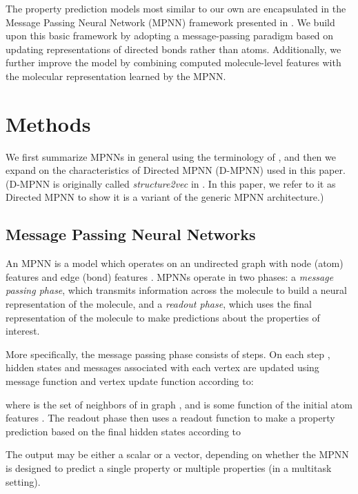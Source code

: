 \documentclass[journal=jcisd8,manuscript=article]{achemso}
\begin{document}
The property prediction models most similar to our own are encapsulated in the Message Passing Neural Network (MPNN) framework presented in \citeauthor{gilmer2017neural}\cite{gilmer2017neural}. We build upon this basic framework by adopting a message-passing paradigm based on updating representations of directed bonds rather than atoms. Additionally, we further improve the model by combining computed molecule-level features with the molecular representation learned by the MPNN.

\section{Methods}

We first summarize MPNNs in general using the terminology of \citeauthor{gilmer2017neural}\cite{gilmer2017neural}, and then we expand on the characteristics of Directed MPNN (D-MPNN)\cite{dai2016discriminative} used in this paper. (D-MPNN is originally called \textit{structure2vec} in \citeauthor{dai2016discriminative}\cite{dai2016discriminative}. In this paper, we refer to it as Directed MPNN to show it is a variant of the generic MPNN architecture.)

\subsection{Message Passing Neural Networks}

An MPNN is a model which operates on an undirected graph  with node (atom) features  and edge (bond) features . MPNNs operate in two phases: a \textit{message passing phase}, which transmits information across the molecule to build a neural representation of the molecule, and a \textit{readout phase}, which uses the final representation of the molecule to make predictions about the properties of interest.

More specifically, the message passing phase consists of  steps. On each step , hidden states  and messages  associated with each vertex  are updated using message function  and vertex update function  according to:

where  is the set of neighbors of  in graph , and  is some function of the initial atom features .
The readout phase then uses a readout function  to make a property prediction based on the final hidden states according to

The output  may be either a scalar or a vector, depending on whether the MPNN is designed to predict a single property or multiple properties (in a multitask setting).
\end{document}
